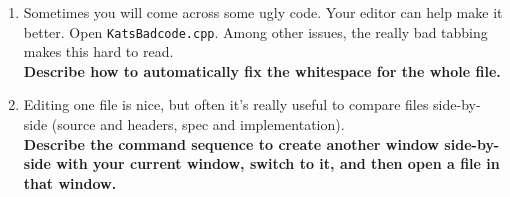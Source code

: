 \documentclass{article}
\begin{document}
\begin{enumerate}
  \item Sometimes you will come across some ugly code. Your editor can help
    make it better. Open \texttt{KatsBadcode.cpp}. Among other issues, the
    really bad tabbing makes this hard to read.\\
    \textbf{Describe how to automatically fix the whitespace for the whole file.}
    \vspace{6em}
  \item Editing one file is nice, but often it's really useful to compare
    files side-by-side (source and headers, spec and implementation).\\
    \textbf{Describe the command sequence to create another window side-by-side with your current window, switch to it, and then open a file in that window.}\\
    \vspace{6em}


\end{enumerate}
\end{document}
